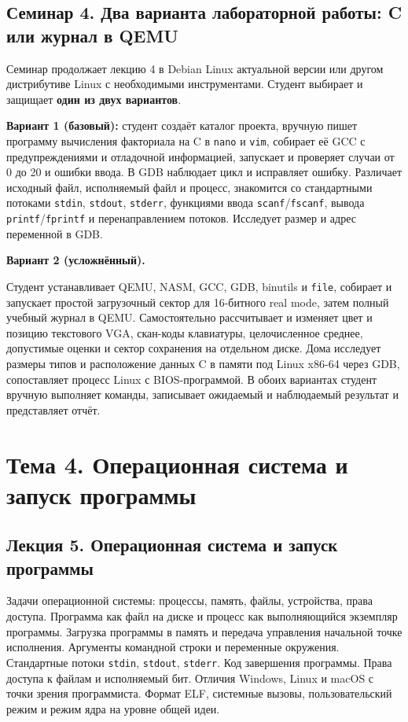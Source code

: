 \documentclass[a4paper,14pt]{extreport}
\begin{document}
\subsection*{Семинар 4. Два варианта лабораторной работы: C или журнал в QEMU}

Семинар продолжает лекцию 4 в Debian Linux актуальной версии или другом
дистрибутиве Linux с необходимыми инструментами. Студент выбирает и защищает
\textbf{один из двух вариантов}.

\textbf{Вариант 1 (базовый):} студент создаёт каталог проекта, вручную пишет
программу вычисления факториала на C в \texttt{nano} и \texttt{vim}, собирает
её GCC с предупреждениями и отладочной информацией, запускает и проверяет
случаи от 0 до 20 и ошибки ввода. В GDB наблюдает цикл и исправляет ошибку.
Различает исходный файл, исполняемый файл и процесс, знакомится со стандартными
потоками \texttt{stdin}, \texttt{stdout}, \texttt{stderr}, функциями ввода
\texttt{scanf}/\texttt{fscanf}, вывода \texttt{printf}/\texttt{fprintf}
и перенаправлением потоков. Исследует размер и адрес переменной в GDB.

\textbf{Вариант 2 (усложнённый).}

Студент устанавливает QEMU, NASM, GCC, GDB, binutils и \texttt{file},
собирает и запускает простой загрузочный сектор
для 16-битного real mode, затем полный учебный журнал в QEMU. Самостоятельно
рассчитывает и изменяет цвет и позицию текстового VGA, скан-коды клавиатуры,
целочисленное среднее, допустимые оценки и сектор сохранения на отдельном
диске. Дома исследует размеры типов и расположение данных C в памяти под
Linux x86-64 через GDB, сопоставляет процесс Linux с BIOS-программой.
В обоих вариантах студент вручную выполняет команды, записывает ожидаемый
и наблюдаемый результат и представляет отчёт.

\section{Тема 4. Операционная система и запуск программы}

\subsection*{Лекция 5. Операционная система и запуск программы}

Задачи операционной системы: процессы, память, файлы, устройства, права доступа. Программа как файл на диске и процесс как выполняющийся экземпляр программы. Загрузка программы в память и передача управления начальной точке исполнения. Аргументы командной строки и переменные окружения. Стандартные потоки \texttt{stdin}, \texttt{stdout}, \texttt{stderr}. Код завершения программы. Права доступа к файлам и исполняемый бит. Отличия Windows, Linux и macOS с точки зрения программиста. Формат ELF, системные вызовы, пользовательский режим и режим ядра на уровне общей идеи.
\end{document}
